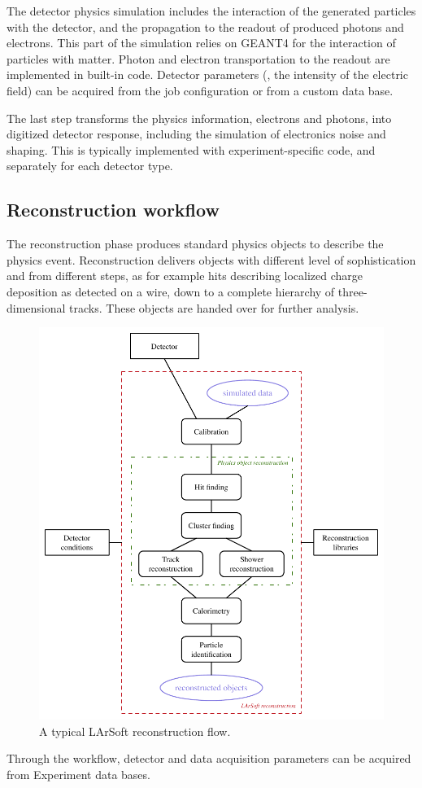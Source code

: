 The detector physics simulation includes the interaction of the
generated particles with the detector, and the propagation to the
readout of produced photons and electrons. This part of the simulation
relies on GEANT4 for the interaction of particles with matter. Photon
and electron transportation to the readout are implemented in built-in
code. Detector parameters (\eg, the intensity of the electric field)
can be acquired from the job configuration or from a custom data base.

The last step transforms the physics information, electrons and photons,
into digitized detector response, including the simulation of
electronics noise and shaping. This is typically implemented with
experiment-specific code, and separately for each detector type.


\subsection{Reconstruction workflow}
\label{ssec:Workflows:Reconstruction}

The reconstruction phase produces standard physics objects to describe
the physics event. Reconstruction delivers objects with different level
of sophistication and from different steps, as for example hits
describing localized charge deposition as detected on a wire, down to a
complete hierarchy of three-dimensional tracks. These objects are handed
over for further analysis.
\begin{figure}[htbp]
  \centering
  \includegraphics{figures/LArSoftReconstructionWorkflow.pdf}
  \caption{\label{fig:LArSoftReconstruction}A typical LArSoft reconstruction flow.}
\end{figure}
Through the workflow, detector and data acquisition parameters
can be acquired from Experiment data bases.

